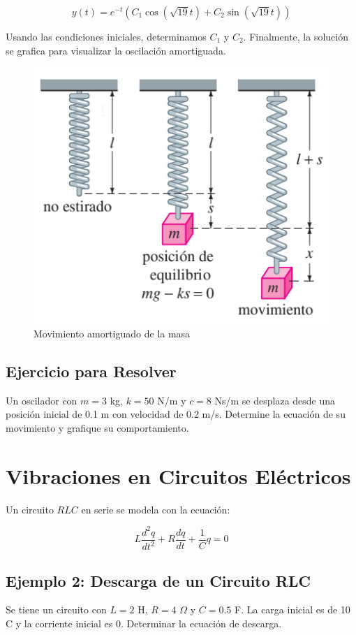 \begin{equation}
y(t) = e^{-t} \left( C_1 \cos (\sqrt{19}t) + C_2 \sin (\sqrt{19}t) \right)
\end{equation}

Usando las condiciones iniciales, determinamos \( C_1 \) y \( C_2 \). Finalmente, la solución se grafica para visualizar la oscilación amortiguada.

\begin{figure}[H]
    \centering
    \includegraphics[width=0.5\linewidth]{images/Modelado 06.png}
    \caption{Movimiento amortiguado de la masa}
    \label{fig:enter-label}
\end{figure}

\subsection*{Ejercicio para Resolver}
Un oscilador con \( m = 3 \) kg, \( k = 50 \) N/m y \( c = 8 \) Ns/m se desplaza desde una posición inicial de 0.1 m con velocidad de 0.2 m/s. Determine la ecuación de su movimiento y grafique su comportamiento.

\section{Vibraciones en Circuitos Eléctricos}
Un circuito \( RLC \) en serie se modela con la ecuación:

\begin{equation}
L \frac{d^2q}{dt^2} + R \frac{dq}{dt} + \frac{1}{C} q = 0
\end{equation}

\subsection*{Ejemplo 2: Descarga de un Circuito RLC}
Se tiene un circuito con \( L = 2 \) H, \( R = 4 \) \( \Omega \) y \( C = 0.5 \) F. La carga inicial es de 10 C y la corriente inicial es 0. Determinar la ecuación de descarga.

